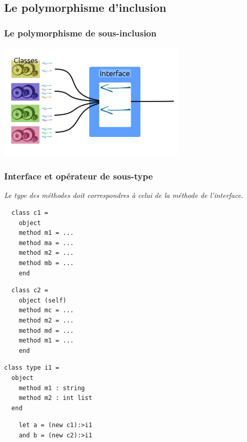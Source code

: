 \subsection{Le polymorphisme d'inclusion} %
\begin{frame}
	\frametitle{Le polymorphisme de sous-inclusion}
	\begin{center}
		\includegraphics[width=9cm]{pics/inclusionObjet.png}
	\end{center}
\end{frame}

\begin{frame}[fragile]
	\frametitle{Interface et opérateur de sous-type}
	\textit{Le type des méthodes doit correspondres à celui de la méthode de l'interface.}\\
	\begin{center}
		\begin{minipage}{0.4\textwidth}
			\lstset{basicstyle=\scriptsize}
  		\begin{lstlisting}
  class c1 =
    object
    method m1 = ...
    method ma = ...
    method m2 = ...
    method mb = ...
    end
			\end{lstlisting}
		\end{minipage}
		\begin{minipage}{0.4\textwidth}
		  \lstset{basicstyle=\scriptsize}
			\begin{lstlisting}
  class c2 =
    object (self)
    method mc = ...
    method m2 = ...
    method md = ...
    method m1 = ...
    end
			\end{lstlisting}
		\end{minipage}
	\end{center}
	\begin{center}
		\begin{minipage}{0.4\textwidth}
			\lstset{basicstyle=\footnotesize}
			\begin{lstlisting}
class type i1 =
  object
    method m1 : string
    method m2 : int list
  end
			\end{lstlisting}
		\end{minipage}
		\begin{minipage}{0.4\textwidth}
			\lstset{basicstyle=\scriptsize}
			\begin{lstlisting}
    let a = (new c1):>i1
    and b = (new c2):>i1
			\end{lstlisting}
		\end{minipage}
	\end{center}
\end{frame}


